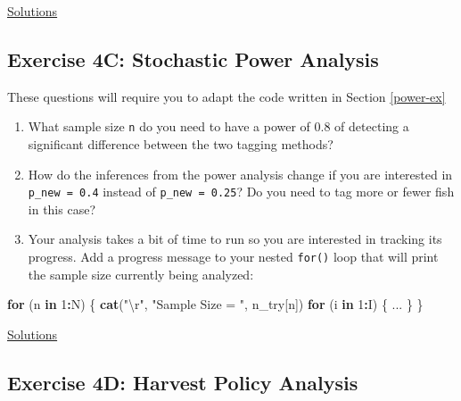 \documentclass[]{book}
\newenvironment{Shaded}{\begin{snugshade}}{\end{snugshade}}
\newcommand{\KeywordTok}[1]{\textcolor[rgb]{0.13,0.29,0.53}{\textbf{#1}}}
\newcommand{\DecValTok}[1]{\textcolor[rgb]{0.00,0.00,0.81}{#1}}
\newcommand{\CharTok}[1]{\textcolor[rgb]{0.31,0.60,0.02}{#1}}
\newcommand{\StringTok}[1]{\textcolor[rgb]{0.31,0.60,0.02}{#1}}
\newcommand{\ControlFlowTok}[1]{\textcolor[rgb]{0.13,0.29,0.53}{\textbf{#1}}}
\newcommand{\OperatorTok}[1]{\textcolor[rgb]{0.81,0.36,0.00}{\textbf{#1}}}
\newcommand{\NormalTok}[1]{#1}
\providecommand{\tightlist}{%
  \setlength{\itemsep}{0pt}\setlength{\parskip}{0pt}}
\theoremstyle{definition}
\theoremstyle{definition}
\theoremstyle{definition}
\theoremstyle{remark}
\begin{document}
\protect\hyperlink{ex4b-answers}{Solutions}

\subsection*{Exercise 4C: Stochastic Power
Analysis}\label{exercise-4c-stochastic-power-analysis}

These questions will require you to adapt the code written in Section
\ref{power-ex}

\begin{enumerate}
\def\labelenumi{\arabic{enumi}.}
\tightlist
\item
  What sample size \texttt{n} do you need to have a power of 0.8 of
  detecting a significant difference between the two tagging methods?
\item
  How do the inferences from the power analysis change if you are
  interested in \texttt{p\_new\ =\ 0.4} instead of
  \texttt{p\_new\ =\ 0.25}? Do you need to tag more or fewer fish in
  this case?
\item
  Your analysis takes a bit of time to run so you are interested in
  tracking its progress. Add a progress message to your nested
  \texttt{for()} loop that will print the sample size currently being
  analyzed:
\end{enumerate}

\begin{Shaded}
\begin{Highlighting}[]
\ControlFlowTok{for}\NormalTok{ (n }\ControlFlowTok{in} \DecValTok{1}\OperatorTok{:}\NormalTok{N) \{}
  \KeywordTok{cat}\NormalTok{(}\StringTok{"}\CharTok{\textbackslash{}r}\StringTok{"}\NormalTok{, }\StringTok{"Sample Size = "}\NormalTok{, n_try[n])}
  \ControlFlowTok{for}\NormalTok{ (i }\ControlFlowTok{in} \DecValTok{1}\OperatorTok{:}\NormalTok{I) \{}
\NormalTok{    ...}
\NormalTok{  \}}
\NormalTok{\}}
\end{Highlighting}
\end{Shaded}

\protect\hyperlink{ex4c-answers}{Solutions}

\subsection*{Exercise 4D: Harvest Policy
Analysis}\label{exercise-4d-harvest-policy-analysis}
\end{document}
